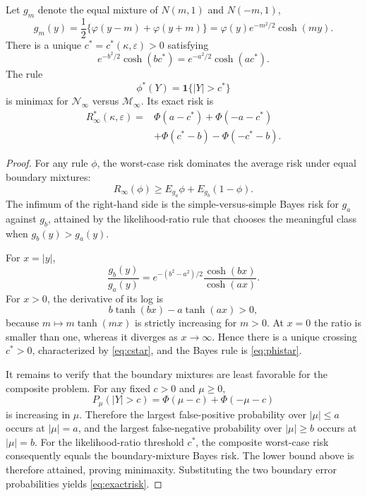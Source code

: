 \documentclass[10pt,a4paper]{amsart}
\begin{document}
\begin{proposition}
\label{prop:critical-exact}
Let $g_m$ denote the equal mixture of $N(m,1)$ and $N(-m,1)$,
\[
g_m(y)=\frac12\{\varphi(y-m)+\varphi(y+m)\}
=\varphi(y)e^{-m^2/2}\cosh(my).
\]
There is a unique $c^*=c^*(\kappa,\varepsilon)>0$ satisfying
\begin{equation}
e^{-b^2/2}\cosh(bc^*)
=
e^{-a^2/2}\cosh(ac^*).
\label{eq:cstar}
\end{equation}
The rule
\begin{equation}
\phi^*(Y)=\mathbf1\{|Y|>c^*\}
\label{eq:phistar}
\end{equation}
is minimax for $\mathcal N_\infty$ versus $\mathcal M_\infty$. Its exact risk is
\begin{equation}
\begin{aligned}
R_\infty^*(\kappa,\varepsilon)
={}&\Phi(a-c^*)+\Phi(-a-c^*)\\
&+\Phi(c^*-b)-\Phi(-c^*-b).
\end{aligned}
\label{eq:exactrisk}
\end{equation}
\end{proposition}

\begin{proof}
For any rule $\phi$, the worst-case risk dominates the average risk under equal boundary mixtures:
\[
R_\infty(\phi)
\ge
E_{g_a}\phi+E_{g_b}(1-\phi).
\]
The infimum of the right-hand side is the simple-versus-simple Bayes risk for $g_a$ against $g_b$, attained by the likelihood-ratio rule that chooses the meaningful class when $g_b(y)>g_a(y)$.

For $x=|y|$,
\[
\frac{g_b(y)}{g_a(y)}
=
e^{-(b^2-a^2)/2}
\frac{\cosh(bx)}{\cosh(ax)}.
\]
For $x>0$, the derivative of its log is
\[
b\tanh(bx)-a\tanh(ax)>0,
\]
because $m\mapsto m\tanh(mx)$ is strictly increasing for $m>0$. At $x=0$ the ratio is smaller than one, whereas it diverges as $x\to\infty$. Hence there is a unique crossing $c^*>0$, characterized by \eqref{eq:cstar}, and the Bayes rule is \eqref{eq:phistar}.

It remains to verify that the boundary mixtures are least favorable for the composite problem. For any fixed $c>0$ and $\mu\ge0$,
\[
P_\mu(|Y|>c)=\Phi(\mu-c)+\Phi(-\mu-c)
\]
is increasing in $\mu$. Therefore the largest false-positive probability over $|\mu|\le a$ occurs at $|\mu|=a$, and the largest false-negative probability over $|\mu|\ge b$ occurs at $|\mu|=b$. For the likelihood-ratio threshold $c^*$, the composite worst-case risk consequently equals the boundary-mixture Bayes risk. The lower bound above is therefore attained, proving minimaxity. Substituting the two boundary error probabilities yields \eqref{eq:exactrisk}.
\end{proof}
\end{document}
